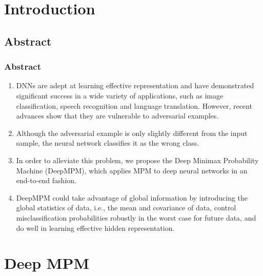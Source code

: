 \documentclass{beamer}
\begin{document}
\section{\textbf{Introduction}}
\subsection*{Abstract}
\begin{frame}[fragile]
\frametitle{Abstract}
\begin{enumerate}
    \item DNNs are adept at learning effective
representation and have demonstrated significant success in a
wide variety of applications, such as image classification,
speech recognition and language translation.
However, recent advances show that they are vulnerable to
adversarial examples.
\item Although the adversarial example is only
slightly different from the input sample, the neural network
classifies it as the wrong class.
\item In order to alleviate this problem,
we propose the Deep Minimax Probability Machine (DeepMPM),
which applies MPM to deep neural networks in an end-to-end
fashion.
\item DeepMPM could
take advantage of global information by introducing the global
statistics of data, i.e., the mean and covariance of data,
control misclassification probabilities robustly in the worst
case for future data, and do well in learning effective hidden
representation.

\end{enumerate}
\end{frame}
\section{\textbf{Deep MPM}}
\end{document}
